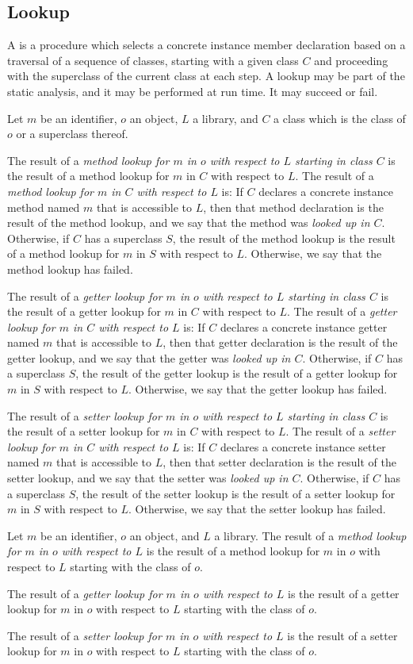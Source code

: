 \documentclass[makeidx]{article}
\begin{document}
{\subsection{Lookup}

\LMHash{}%
A  is a procedure which selects
a concrete instance member declaration based on a traversal of
a sequence of classes, starting with a given class $C$
and proceeding with the superclass of the current class at each step.
A lookup may be part of the static analysis, and it may be performed
at run time. It may succeed or fail.


{ %

\def\LookupDefinitionWithStart#1{
\LMHash{}%
The result of a
{\em {#1} lookup for $m$ in $o$ with respect to $L$ starting in class $C$}
is the result of a {#1} lookup for $m$ in $C$ with respect to $L$.
The result of a {\em {#1} lookup for $m$ in $C$ with respect to $L$} is:
If $C$ declares a concrete instance {#1} named $m$
that is accessible to $L$,
then that {#1} declaration is the result of the {#1} lookup,
and we say that the {#1} was {\em looked up in $C$}.
Otherwise, if $C$ has a superclass $S$,
the result of the {#1} lookup is
the result of a {#1} lookup for $m$ in $S$ with respect to $L$.
Otherwise, we say that the {#1} lookup has failed.

}

\LMHash{}%
Let $m$ be an identifier, $o$ an object, $L$ a library,
and $C$ a class which is the class of $o$ or a superclass thereof.

\LookupDefinitionWithStart{method}
\LookupDefinitionWithStart{getter}
\LookupDefinitionWithStart{setter}

\def\LookupDefinition#1{%
The result of a
{\em {#1} lookup for $m$ in $o$ with respect to $L$}
is the result of a
{#1} lookup for $m$ in $o$ with respect to $L$
starting with the class of $o$.
}

\LMHash{}%
Let $m$ be an identifier, $o$ an object, and $L$ a library.
\LookupDefinition{method}
\LookupDefinition{getter}
\LookupDefinition{setter}

}}
\end{document}
